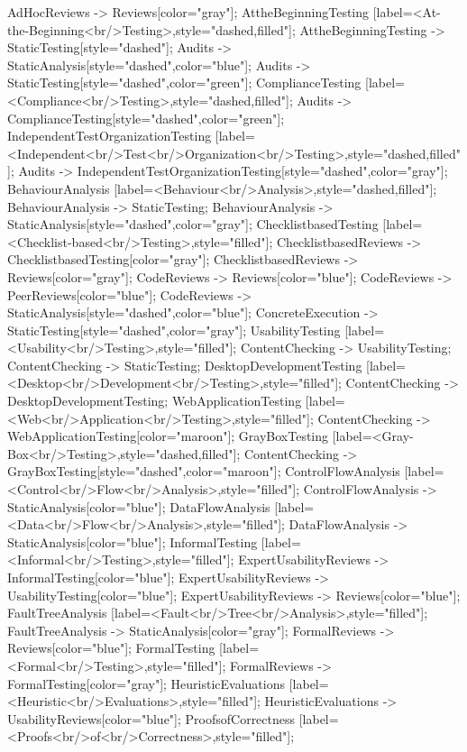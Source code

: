 \documentclass{article}
\begin{document}
{AdHocReviews -> Reviews[color="gray"];
AttheBeginningTesting [label=<At-the-Beginning<br/>Testing>,style="dashed,filled"];
AttheBeginningTesting -> StaticTesting[style="dashed"];
Audits -> StaticAnalysis[style="dashed",color="blue"];
Audits -> StaticTesting[style="dashed",color="green"];
ComplianceTesting [label=<Compliance<br/>Testing>,style="dashed,filled"];
Audits -> ComplianceTesting[style="dashed",color="green"];
IndependentTestOrganizationTesting [label=<Independent<br/>Test<br/>Organization<br/>Testing>,style="dashed,filled"];
Audits -> IndependentTestOrganizationTesting[style="dashed",color="gray"];
BehaviourAnalysis [label=<Behaviour<br/>Analysis>,style="dashed,filled"];
BehaviourAnalysis -> StaticTesting;
BehaviourAnalysis -> StaticAnalysis[style="dashed",color="gray"];
ChecklistbasedTesting [label=<Checklist-based<br/>Testing>,style="filled"];
ChecklistbasedReviews -> ChecklistbasedTesting[color="gray"];
ChecklistbasedReviews -> Reviews[color="gray"];
CodeReviews -> Reviews[color="blue"];
CodeReviews -> PeerReviews[color="blue"];
CodeReviews -> StaticAnalysis[style="dashed",color="blue"];
ConcreteExecution -> StaticTesting[style="dashed",color="gray"];
UsabilityTesting [label=<Usability<br/>Testing>,style="filled"];
ContentChecking -> UsabilityTesting;
ContentChecking -> StaticTesting;
DesktopDevelopmentTesting [label=<Desktop<br/>Development<br/>Testing>,style="filled"];
ContentChecking -> DesktopDevelopmentTesting;
WebApplicationTesting [label=<Web<br/>Application<br/>Testing>,style="filled"];
ContentChecking -> WebApplicationTesting[color="maroon"];
GrayBoxTesting [label=<Gray-Box<br/>Testing>,style="dashed,filled"];
ContentChecking -> GrayBoxTesting[style="dashed",color="maroon"];
ControlFlowAnalysis [label=<Control<br/>Flow<br/>Analysis>,style="filled"];
ControlFlowAnalysis -> StaticAnalysis[color="blue"];
DataFlowAnalysis [label=<Data<br/>Flow<br/>Analysis>,style="filled"];
DataFlowAnalysis -> StaticAnalysis[color="blue"];
InformalTesting [label=<Informal<br/>Testing>,style="filled"];
ExpertUsabilityReviews -> InformalTesting[color="blue"];
ExpertUsabilityReviews -> UsabilityTesting[color="blue"];
ExpertUsabilityReviews -> Reviews[color="blue"];
FaultTreeAnalysis [label=<Fault<br/>Tree<br/>Analysis>,style="filled"];
FaultTreeAnalysis -> StaticAnalysis[color="gray"];
FormalReviews -> Reviews[color="blue"];
FormalTesting [label=<Formal<br/>Testing>,style="filled"];
FormalReviews -> FormalTesting[color="gray"];
HeuristicEvaluations [label=<Heuristic<br/>Evaluations>,style="filled"];
HeuristicEvaluations -> UsabilityReviews[color="blue"];
ProofsofCorrectness [label=<Proofs<br/>of<br/>Correctness>,style="filled"];
}
\end{document}
